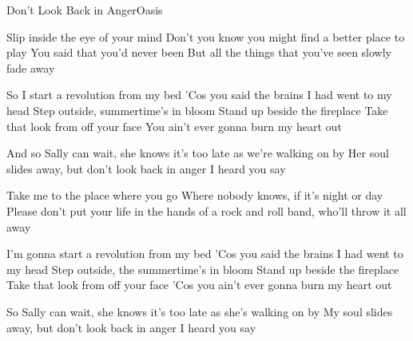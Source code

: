 \begin{song}{Don't Look Back in Anger}{Oasis}{}


Slip inside the eye of your mind
Don't you know you might find a better place to play
You said that you'd never been
But all the things that you've seen slowly fade away

So I start a revolution from my bed
'Cos you said the brains I had went to my head
Step outside, summertime's in bloom
Stand up beside the fireplace
Take that look from off your face
You ain't ever gonna burn my heart out

And so Sally can wait, she knows it's too late
as we're walking on by
Her soul slides away, but don't look back in anger
I heard you say

Take me to the place where you go
Where nobody knows, if it's night or day
Please don't put your life in the hands
of a rock and roll band, who'll throw it all away

\newpage
{}
I'm gonna start a revolution from my bed
'Cos you said the brains I had went to my head
Step outside, the summertime's in bloom
Stand up beside the fireplace
Take that look from off your face
'Cos you ain't ever gonna burn my heart out

So Sally can wait, she knows it's too late
as she's walking on by
My soul slides away, but don't look back in anger
I heard you say


\end{song}
